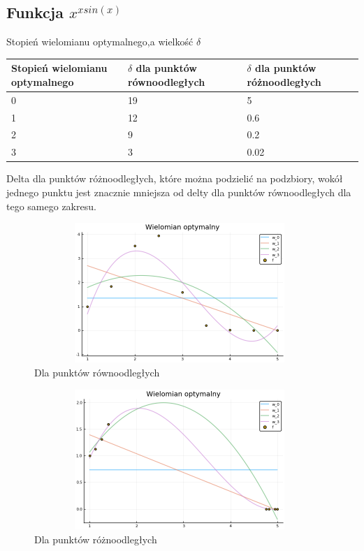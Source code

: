 \documentclass{article}
\begin{document}
\subsection{Funkcja $x^{x sin(x)}$}

Stopień wielomianu optymalnego,a wielkość $\delta$
\begin{center}
    \begin{tabular}{ |p{3cm}|p{4.6cm}|p{4.6cm}|}
     \hline
     Stopień wielomianu optymalnego & $\delta$ dla punktów równoodległych & $\delta$ dla punktów różnoodległych\\
     \hline
     0 & 19 & 5\\
     \hline
     1 & 12 & 0.6\\
     \hline
     2 & 9 & 0.2\\
     \hline
     3 & 3 & 0.02\\
     \hline
    \end{tabular}
\end{center}
Delta dla punktów różnoodległych, które można podzielić na podzbiory, wokół jednego punktu jest znacznie mniejsza od delty dla punktów równoodległych dla tego samego zakresu.
\begin{figure}[h]
\center
\includegraphics[width=11cm,height=5.3cm]{xpotxsin1.png}
\caption{Dla punktów równoodległych}
\end{figure}

\begin{figure}[h]
\centering
\includegraphics[width=11cm,height=5.3cm]{xpotxsin2.png}
\caption{Dla punktów różnoodległych}
\end{figure}
\end{document}
